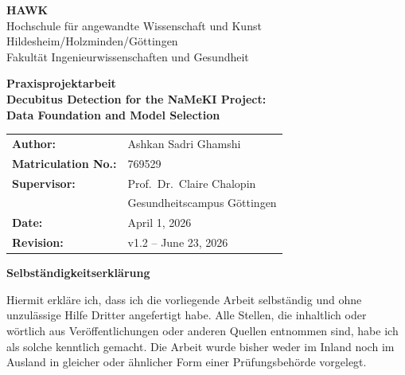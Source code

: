 \documentclass[a4paper,12pt,twoside]{report}
\begin{document}
\begin{titlepage}
  \centering
  \vspace*{1.5cm}

  {\Large\bfseries HAWK}\\[4pt]
  {\normalsize Hochschule f{\"u}r angewandte Wissenschaft und Kunst\\
  Hildesheim/Holzminden/G{\"o}ttingen}\\[6pt]
  {\normalsize Fakult{\"a}t Ingenieurwissenschaften und Gesundheit}

  \vspace{2.5cm}

  {\LARGE\bfseries Praxisprojektarbeit}\\[12pt]
  {\Large\bfseries Decubitus Detection for the NaMeKI Project:\\
  Data Foundation and Model Selection}

  \vspace{2.5cm}

  \begin{tabular}{ll}
    \textbf{Author:}          & Ashkan Sadri Ghamshi \\
    \textbf{Matriculation No.:} & 769529 \\[6pt]
    \textbf{Supervisor:}      & Prof.\ Dr.\ Claire Chalopin \\
                               & Gesundheitscampus G{\"o}ttingen \\[6pt]
    \textbf{Date:}            & April 1, 2026\\[4pt]
    \textbf{Revision:}        & v1.2 -- June 23, 2026
  \end{tabular}

  \vfill
\end{titlepage}

\clearpage
\thispagestyle{empty}
\vspace*{3cm}
\begin{center}
  {\Large\bfseries Selbst{\"a}ndigkeitserkl{\"a}rung}
\end{center}

\vspace{1.5cm}

Hiermit erkl{\"a}re ich, dass ich die vorliegende Arbeit selbst{\"a}ndig und ohne
unzul{\"a}ssige Hilfe Dritter angefertigt habe. Alle Stellen, die inhaltlich oder
w{\"o}rtlich aus Ver{\"o}ffentlichungen oder anderen Quellen entnommen sind, habe
ich als solche kenntlich gemacht. Die Arbeit wurde bisher weder im Inland noch
im Ausland in gleicher oder {\"a}hnlicher Form einer Pr{\"u}fungsbeh{\"o}rde vorgelegt.
\end{document}
